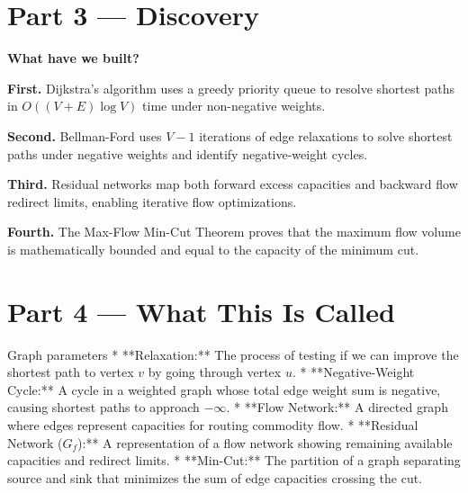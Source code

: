 \documentclass[12pt, a4paper]{book}
\begin{document}
\newpage

\section{Part 3 --- Discovery}

\begin{discoverybox}
\textbf{What have we built?}

\textbf{First.} Dijkstra's algorithm uses a greedy priority queue to resolve shortest paths in $O((V+E) \log V)$ time under non-negative weights.

\textbf{Second.} Bellman-Ford uses $V-1$ iterations of edge relaxations to solve shortest paths under negative weights and identify negative-weight cycles.

\textbf{Third.} Residual networks map both forward excess capacities and backward flow redirect limits, enabling iterative flow optimizations.

\textbf{Fourth.} The Max-Flow Min-Cut Theorem proves that the maximum flow volume is mathematically bounded and equal to the capacity of the minimum cut.
\end{discoverybox}

\newpage

\section{Part 4 --- What This Is Called}

\begin{namedconcept}{Graph parameters}
* **Relaxation:** The process of testing if we can improve the shortest path to vertex $v$ by going through vertex $u$.
* **Negative-Weight Cycle:** A cycle in a weighted graph whose total edge weight sum is negative, causing shortest paths to approach $-\infty$.
* **Flow Network:** A directed graph where edges represent capacities for routing commodity flow.
* **Residual Network ($G_f$):** A representation of a flow network showing remaining available capacities and redirect limits.
* **Min-Cut:** The partition of a graph separating source and sink that minimizes the sum of edge capacities crossing the cut.
\end{namedconcept}

\newpage

\end{document}

